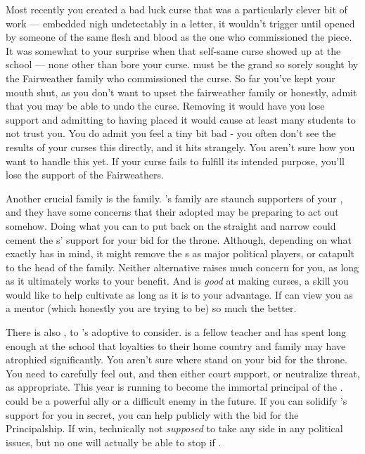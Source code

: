 \documentclass[char]{GL2020}
\begin{document}
Most recently you created a bad luck curse that was a particularly clever bit of work — embedded nigh undetectably in a letter, it wouldn't trigger until opened by someone of the same flesh and blood as the one who commissioned the piece. It was somewhat to your surprise when that self-same curse showed up at the school — none other than \cInitiate{\intro} bore your curse. \cInitiate{\They} must be the grand\cInitiate{\offspring} so sorely sought by the Fairweather family who commissioned the curse. So far you've kept your mouth shut, as you don't want to upset the fairweather family or honestly, admit that you may be able to undo the curse. Removing it would have you lose support and admitting to having placed it would cause at least many students to not trust you.  You do admit you feel a tiny bit bad - you often don't see the results of your curses this directly, and it hits strangely. You aren’t sure how you want to handle this yet. If your curse fails to fulfill its intended purpose, you'll lose the support of the Fairweathers.

Another crucial family is the \cAdopted{\formal} family. \cAdopted{\intro}'s family are staunch supporters of your \cQueen{\parent}, and they have some concerns that their adopted \cAdopted{\offspring} may be preparing to act out somehow. Doing what you can to put \cAdopted{\them} back on the straight and narrow could cement the \cAdopted{\formal}s' support for your bid for the throne. Although, depending on what exactly \cAdopted{} has in mind, it might remove the \cAdopted{\formal}s as major political players, or catapult \cAdopted{} to the head of the family. Neither alternative raises much concern for you, as long as it ultimately works to your benefit. And \cAdopted{} is \emph{good} at making curses, a skill you would like to help \cAdopted{\them} cultivate as long as it is to your advantage. If \cAdopted{} can view you as a mentor (which honestly you are trying to be) so much the better.

There is also \cMusic{\intro}, \cMusic{\auncle} to \cAdopted{}'s adoptive \cAdoptedParentOne{\parent} to consider. \cMusic{} is a fellow teacher and has spent long enough at the school that \cMusic{\their} loyalties to their home country and family may have atrophied significantly. You aren't sure where \cMusic{\they} stand on your bid for the throne. You need to carefully feel \cMusic{\them} out, and then either court \cMusic{\their} support, or neutralize \cMusic{\their} threat, as appropriate.  This year \cMusic{} is running to become the immortal principal of the \pSc{}. \cMusic{\They} could be a powerful ally or a difficult enemy in the future. If you can solidify \cMusic{}’s support for you in secret, you can help \cMusic{\them} publicly with the bid for the Principalship. If  \cMusic{\they} win\cMusic{\verbs}, technically \cMusic{\theyare} not \emph{supposed} to take any side in any political issues, but no one will actually be able to stop \cMusic{\them} if \cMusic{\theydo}.
\end{document}
